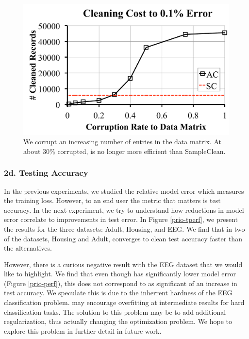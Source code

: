 \begin{figure}[ht!]
\centering
 \includegraphics[width=0.6\columnwidth]{exp/exp9.pdf}
 \caption{We corrupt an increasing number of entries in the data matrix. At about 30\% corrupted, \sys is no longer more efficient than SampleClean. \label{bias}}
\end{figure}

\subsubsection{2d. Testing Accuracy}
In the previous experiments, we studied the relative model error which measures the training loss. 
However, to an end user the metric that matters is test accuracy.
In the next experiment, we try to understand how reductions in model error correlate to improvements in test error.
In Figure \ref{prio-tperf}, we present the results for the three datasets: Adult, Housing, and EEG.
We find that in two of the datasets, Housing and Adult, \sys converges to clean test accuracy faster than the alternatives.

However, there is a curious negative result with the EEG dataset that we would like to highlight. 
We find that even though \sys has significantly lower model error (Figure \ref{prio-perf}), this does not correspond to as significant of an increase in test accuracy.
We speculate this is due to the inherrent hardness of the EEG classification problem.
\sys may encourage overfitting at intermediate results for hard classification tasks.
The solution to this problem may be to add additional regularization, thus actually changing the optimization problem.
We hope to explore this problem in further detail in future work.

